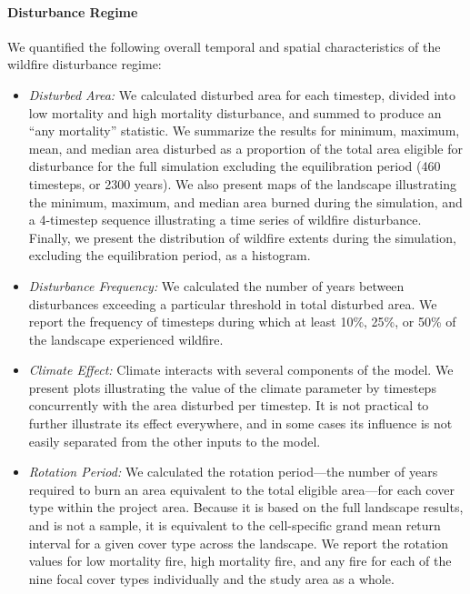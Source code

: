\paragraph{Disturbance Regime} We quantified the following overall temporal and spatial characteristics of the wildfire disturbance regime:
\begin{itemize}
	\item \emph{Disturbed Area:} We calculated disturbed area for each timestep, divided into low mortality and high mortality disturbance, and summed to produce an ``any mortality'' statistic. We summarize the results for minimum, maximum, mean, and median area disturbed as a proportion of the total area eligible for disturbance for the full simulation excluding the equilibration period (460 timesteps, or 2300 years). We also present maps of the landscape illustrating the minimum, maximum, and median area burned during the simulation, and a 4-timestep sequence illustrating a time series of wildfire disturbance. Finally, we present the distribution of wildfire extents during the simulation, excluding the equilibration period, as a histogram.
	\item \emph{Disturbance Frequency:} We calculated the number of years between disturbances exceeding a particular threshold in total disturbed area. We report the frequency of timesteps during which at least 10\%, 25\%, or 50\% of the landscape experienced wildfire.
	\item \emph{Climate Effect:} Climate interacts with several components of the model. We present plots illustrating the value of the climate parameter by timesteps concurrently with the area disturbed per timestep. It is not practical to further illustrate its effect everywhere, and in some cases its influence is not easily separated from the other inputs to the model. 
	\item \emph{Rotation Period:} We calculated the rotation period---the number of years required to burn an area equivalent to the total eligible area---for each cover type within the project area. Because it is based on the full landscape results, and is not a sample, it is equivalent to the cell-specific grand mean return interval for a given cover type across the landscape. We report the rotation values for low mortality fire, high mortality fire, and any fire for each of the nine focal cover types individually and the study area as a whole.

\end{itemize}
